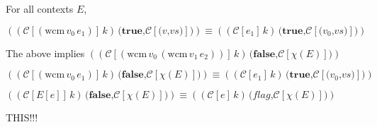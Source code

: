 \documentclass[ms,electronic,twosidetoc,letterpaper,chaptercenter,parttop]{byumsphd}
\begin{document}
\begin{theorem}
For all contexts $E$,
\end{theorem}
$((\mathcal{C}[(\mathrm{wcm}\,v_0\,e_1)]\,k)\,\textbf{(}\textbf{true}\textbf{,}\mathcal{C}[\textbf{(}v\textbf{,}vs\textbf{)}]\textbf{)})\equiv((\mathcal{C}[e_1]\,k)\,\textbf{(}\textbf{true}\textbf{,}\mathcal{C}[\textbf{(}v_0\textbf{,}vs\textbf{)}]\textbf{)})$

The above implies $((\mathcal{C}[(\mathrm{wcm}\,v_0\,(\mathrm{wcm}\,v_1\,e_2))]\,k)\,\textbf{(}\textbf{false}\textbf{,}\mathcal{C}[\chi(E)]\textbf{)})$

$((\mathcal{C}[(\mathrm{wcm}\,v_0\,e_1)]\,k)\,\textbf{(}\textbf{false}\textbf{,}\mathcal{C}[\chi(E)]\textbf{)})\equiv((\mathcal{C}[e_1]\,k)\,\textbf{(}\textbf{true}\textbf{,}\mathcal{C}[\textbf{(}v_0\textbf{,}vs\textbf{)}]\textbf{)})$

$((\mathcal{C}[E[e]]\,k)\,\textbf{(}\textbf{false}\textbf{,}\mathcal{C}[\chi(E)]\textbf{)})\equiv((\mathcal{C}[e]\,k)\,\textbf{(}\textit{flag}\textbf{,}\mathcal{C}[\chi(E)]\textbf{)})$

THIS!!!

























\end{document}
